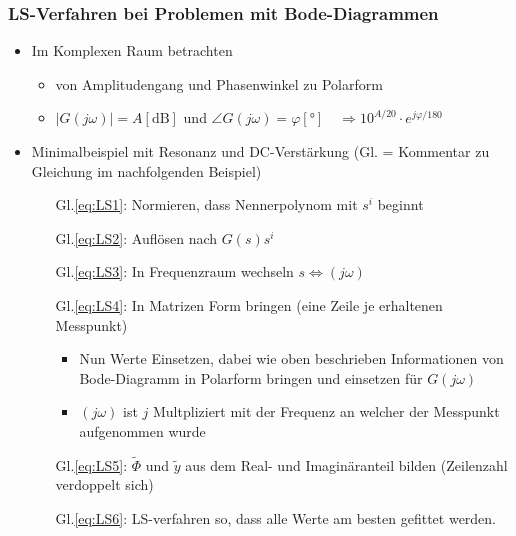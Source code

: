 \subsubsection{LS-Verfahren bei Problemen mit Bode-Diagrammen}
\begin{itemize}
	\item Im Komplexen Raum betrachten
	\begin{itemize}
		\item von Amplitudengang und Phasenwinkel zu Polarform
		\item $\vert G(j\omega)\vert=A\left[\text{dB}\right]$ und $\angle G(j\omega) = \varphi \left[\si{\degree}\right] \quad \Rightarrow 10^{A/20}\cdot e^{j\varphi/180}$ 
	\end{itemize}
	\item Minimalbeispiel mit Resonanz und DC-Verstärkung (Gl. = Kommentar zu Gleichung im nachfolgenden Beispiel)
	 \begin{itemize}
	 	\item [Gl.\ref{eq:LS1}:] Normieren, dass Nennerpolynom mit  $s^i$ beginnt
	 	\item [Gl.\ref{eq:LS2}:] Auflösen nach $G(s)s^i$
	 	\item [Gl.\ref{eq:LS3}:] In Frequenzraum wechseln $s\Leftrightarrow(j\omega)$
	 	\item [Gl.\ref{eq:LS4}:] In Matrizen Form bringen (eine Zeile je erhaltenen Messpunkt)
\begin{itemize}
	 	 	\item Nun Werte Einsetzen, dabei wie oben beschrieben Informationen von Bode-Diagramm in Polarform bringen und einsetzen für $G(j\omega)$ 
	 		\item $(j\omega)$ ist $j$ Multpliziert mit der Frequenz an welcher der Messpunkt aufgenommen wurde
\end{itemize}
	 	\item [Gl.\ref{eq:LS5}:] $\tilde{\Phi}$ und $\tilde{y}$ aus dem Real- und Imaginäranteil bilden (Zeilenzahl verdoppelt sich)
	 	\item [Gl.\ref{eq:LS6}:] LS-verfahren so, dass alle Werte am besten gefittet werden. 
	 \end{itemize}
\end{itemize}
